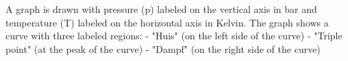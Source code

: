 A graph is drawn with pressure (p) labeled on the vertical axis in bar and temperature (T) labeled on the horizontal axis in Kelvin. The graph shows a curve with three labeled regions:  
- "Huis" (on the left side of the curve)  
- "Triple point" (at the peak of the curve)  
- "Dampf" (on the right side of the curve)